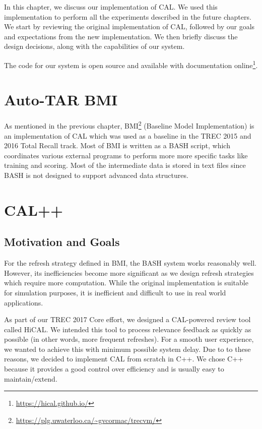 \label{chap:implementation}
In this chapter, we discuss our implementation of CAL. We used this
implementation to perform all the experiments described in the future chapters.
We start by reviewing the original implementation of CAL, followed by our goals
and expectations from the new implementation. We then briefly discuss the
design decisions, along with the capabilities of our system.

The code for our system is open source and available with documentation
online\footnote{\url{https://hical.github.io/}}.

\section{Auto-TAR BMI}
As mentioned in the previous chapter,
BMI\footnote{\url{https://plg.uwaterloo.ca/~gvcormac/trecvm/}} (Baseline Model
Implementation) is an implementation of CAL which was used as a baseline in the
TREC 2015 and 2016 Total Recall track. Most of BMI is written as
a BASH script, which coordinates various external programs to perform more
more specific tasks like training and scoring. Most of the intermediate data is
stored in text files since BASH is not designed to support advanced data
structures.

\section{CAL++}

\subsection{Motivation and Goals}
For the refresh strategy defined in BMI, the BASH system works reasonably well.
However, its inefficiencies become more significant as we design refresh
strategies which require more computation. While the original
implementation is suitable for simulation purposes, it is inefficient and
difficult to use in real world applications.

As part of our TREC 2017 Core effort, we designed a CAL-powered review tool
called HiCAL. We intended this tool to process relevance feedback as quickly as
possible (in other words, more frequent refreshes). For a smooth user
experience, we wanted to achieve this with minimum possible system delay. Due to
to these reasons, we decided to implement CAL from scratch in C++. We chose C++
because it provides a good control over efficiency and is usually easy to
maintain/extend.


